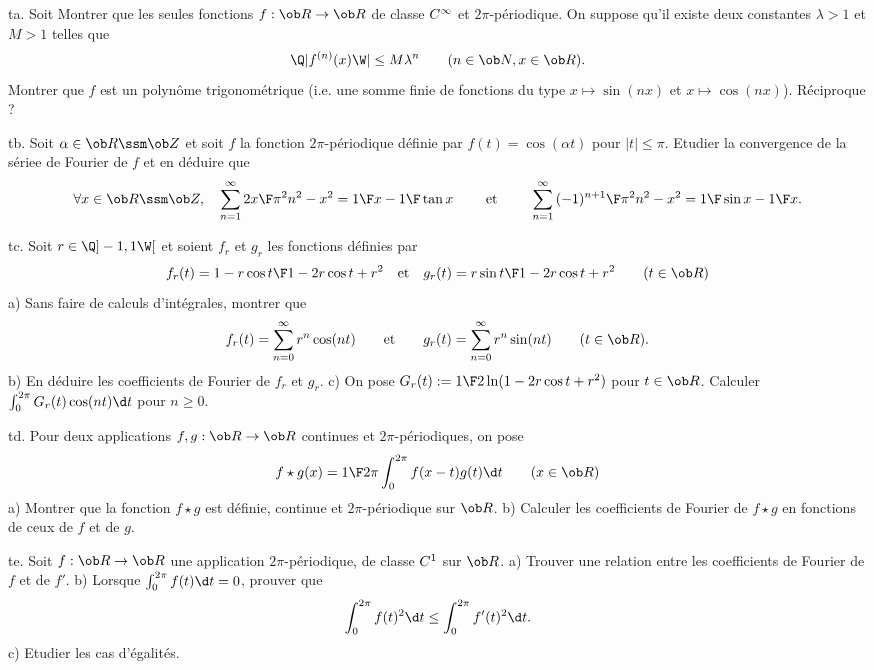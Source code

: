 \exo [Level=2,Fight=0,Learn=0,Type=\Exercices,Field=\SériesDeFourier,Origin=] ta. 
Soit Montrer que les seules fonctions $f:\ob R\to\ob R$ de classe $\sc C^\infty$ 
et $2\pi$-périodique. On suppose qu'il existe deux constantes $\lambda>1$ et $M>1$ telles que 
$$
\Q|f^{(n)}(x)\W|\le M\lambda^n\qquad(n\in\ob N, x\in\ob R). 
$$
Montrer que $f$ est un polynôme trigonométrique 
(i.e. une somme finie de fonctions du type $x\mapsto\sin(nx)$ et $x\mapsto\cos(nx)$). Réciproque ?

\exo [Level=2,Fight=0,Learn=0,Type=\Exercices,Field=\SériesDeFourier,Origin=] tb. 
Soit $\alpha\in\ob R\ssm\ob Z$ et soit $f$ la fonction $2\pi$-périodique 
définie par $f(t)=\cos(\alpha t)$ pour $|t|\le\pi$. 
Etudier la convergence de la sériee de Fourier de $f$ et en déduire que 
$$
\forall x\in\ob R\ssm\ob Z, \quad \sum_{n=1}^\infty{2x\F\pi^2n^2-x^2}={1\F x}-{1\F\tan x} \qquad\hbox{ et }
\qquad \sum_{n=1}^\infty{(-1)^{n+1}\F\pi^2n^2-x^2}={1\F\sin x}-{1\F x}. 
$$

\exo [Level=2,Fight=0,Learn=0,Type=\Exercices,Field=\SériesDeFourier,Origin=] tc. 
Soit $r\in\Q]-1,1\W[$ et soient $f_r$ et $g_r$ les fonctions définies par 
$$
f_r(t)={1-r\cos t\F 1-2r\cos t+r^2}\quad\hbox{et}\quad g_r(t)={r\sin t\F 1-2r\cos t+r^2}\qquad(t\in\ob R)
$$
a) Sans faire de calculs d'intégrales, montrer que 
$$
f_r(t)=\sum_{n=0}^\infty r^n\cos(nt)\qquad\hbox{et}\qquad g_r(t)=\sum_{n=0}^\infty r^n\sin(nt)\qquad(t\in\ob R). 
$$
b) En déduire les coefficients de Fourier de $f_r$ et $g_r$. \pn
c) On pose $G_r(t):={1\F2}\ln(1-2r\cos t+r^2)$ pour $t\in\ob R$. Calculer $\int_0^{2\pi}G_r(t)\cos(nt)\d t$ pour $n\ge 0$. 


\exo [Level=2,Fight=1,Learn=0,Type=\Exercices,Field=\SériesDeFourier,Origin=] td. 
Pour deux applications $f,g:\ob R\to\ob R$ continues et $2\pi$-périodiques, on pose 
$$
f\star g(x)={1\F2\pi}\int_0^{2\pi}f(x-t)g(t)\d t\qquad(x\in\ob R)
$$
a) Montrer que la fonction $f\star g$ est définie, 
continue et $2\pi$-périodique sur $\ob R$.  \pn
b) Calculer les coefficients de Fourier de $f\star g$ en fonctions de ceux de $f$ et de $g$. \pn


\exo [Level=2,Fight=1,Learn=2,Type=\Exercices,Field=\SériesDeFourier,Origin=] te. 
Soit $f:\ob R\to\ob R$ une application $2\pi$-périodique, 
de classe $\sc C^1$ sur $\ob R$. \pn
a) Trouver une relation entre les coefficients de Fourier de $f$ et de $f'$. \pn
b) Lorsque $\int_0^{2\pi}f(t)\d t=0$, prouver que 
$$
\int_0^{2\pi}f(t)^2\d t\le \int_0^{2\pi}f'(t)^2\d t. 
$$
c) Etudier les cas d'égalités. 

